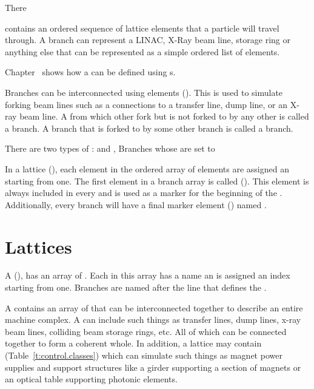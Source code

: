 There

 contains an ordered sequence of lattice elements that a particle will travel through. A
branch can represent a LINAC, X-Ray beam line, storage ring or anything else that can be represented
as a simple ordered list of elements.

Chapter~ shows how a  can be defined using s.

Branches can be interconnected using  elements (). This
is used to simulate forking beam lines such as a connections to a transfer line, dump line, or an
X-ray beam line. A  from which other  fork but is not forked to by any
other  is called a  branch. A branch that is forked to by some other branch
is called a  branch.

There are two types of :  and , 
Branches whose  are set to 



In a lattice  (), each element in the
ordered array of elements are assigned an 
starting from one. The first element in a branch array
is called  ().
This element is always included in every   and is used as a
marker for the beginning of the .  Additionally, every branch will have a final
marker element () named .

\section{Lattices}
\label{s:lattice.def}

A  (), has an array of . 
Each  in this array
has a name an is assigned an index starting from one. 
Branches are named after the line that defines the .

A  contains an array of  that can be interconnected 
together to describe an entire machine
complex. A  can include such things as transfer lines, dump lines, x-ray beam lines,
colliding beam storage rings, etc. All of which can be connected together to form a coherent whole. 
In addition, a lattice may contain  (Table~\ref{t:control.classes}) 
which can
simulate such things as magnet power supplies and support structures like a girder supporting
a section of magnets or an optical table supporting photonic elements.

